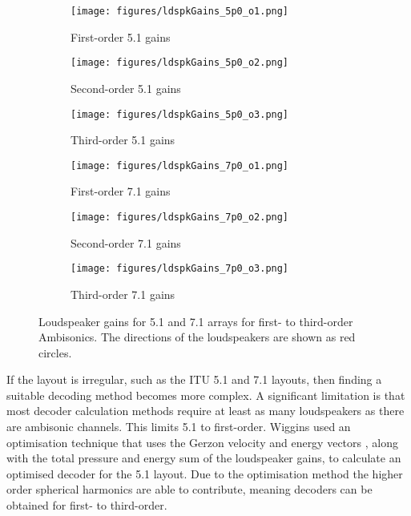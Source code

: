 \documentclass[12pt]{report}
\begin{document}
\begin{figure}[tbp]
  \centering

  \begin{subfigure}{0.32\textwidth}
    \texttt{[image: figures/ldspkGains\_5p0\_o1.png]}
    \caption{\centering First-order 5.1 gains}
  \end{subfigure}
  \hfill
  \begin{subfigure}{0.32\textwidth}
    \texttt{[image: figures/ldspkGains\_5p0\_o2.png]}
    \caption{\centering Second-order 5.1 gains}
  \end{subfigure}
  \hfill
    \begin{subfigure}{0.32\textwidth}
    \texttt{[image: figures/ldspkGains\_5p0\_o3.png]}
    \caption{\centering Third-order 5.1 gains}
  \end{subfigure}
  \newline
  \begin{subfigure}{0.32\textwidth}
    \texttt{[image: figures/ldspkGains\_7p0\_o1.png]}
    \caption{\centering First-order 7.1 gains}
  \end{subfigure}
  \hfill
    \begin{subfigure}{0.32\textwidth}
    \texttt{[image: figures/ldspkGains\_7p0\_o2.png]}
    \caption{\centering Second-order 7.1 gains}
  \end{subfigure}
  \hfill
  \begin{subfigure}{0.32\textwidth}
    \texttt{[image: figures/ldspkGains\_7p0\_o3.png]}
    \caption{\centering Third-order 7.1 gains}
  \end{subfigure}
  \hfill
  \caption{Loudspeaker gains for 5.1 and 7.1 arrays for first- to third-order Ambisonics. The directions of the loudspeakers are shown as red circles.}
  \label{fig:irregular_loudspeaker_gains}
\end{figure}

If the layout is irregular, such as the ITU 5.1 and 7.1 layouts, then finding a suitable decoding method becomes more complex.
A significant limitation is that most decoder calculation methods require at least as many loudspeakers as there are ambisonic channels.
This limits 5.1 to first-order.
Wiggins \cite{Wiggins2007} used an optimisation technique that uses the Gerzon velocity and energy vectors \cite{Gerzon1992a}, along with the total pressure and energy sum of the loudspeaker gains, to calculate an optimised decoder for the 5.1 layout.
Due to the optimisation method the higher order spherical harmonics are able to contribute, meaning decoders can be obtained for first- to third-order.
\end{document}
